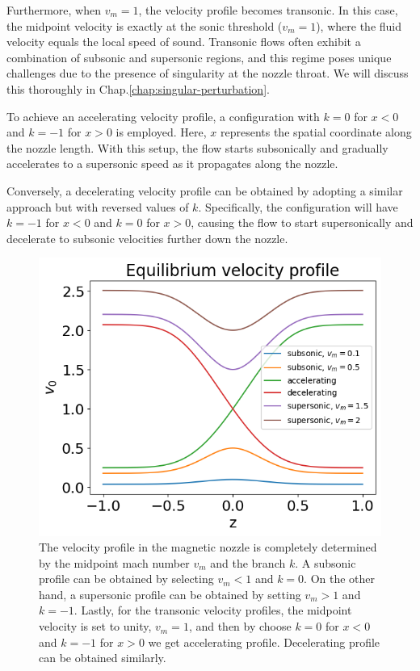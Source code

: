 Furthermore, when $v_m = 1$, the velocity profile becomes transonic. In this case, the midpoint velocity is exactly at the sonic threshold ($v_m = 1$), where the fluid velocity equals the local speed of sound. Transonic flows often exhibit a combination of subsonic and supersonic regions, and this regime poses unique challenges due to the presence of singularity at the nozzle throat. We will discuss this thoroughly in Chap.\ref{chap:singular-perturbation}.

To achieve an accelerating velocity profile, a configuration with $k = 0$ for $x < 0$ and $k = -1$ for $x > 0$ is employed. Here, $x$ represents the spatial coordinate along the nozzle length. With this setup, the flow starts subsonically and gradually accelerates to a supersonic speed as it propagates along the nozzle.

Conversely, a decelerating velocity profile can be obtained by adopting a similar approach but with reversed values of $k$. Specifically, the configuration will have $k = -1$ for $x < 0$ and $k = 0$ for $x > 0$, causing the flow to start supersonically and decelerate to subsonic velocities further down the nozzle.

\begin{figure}[H]
	\centering
	\includegraphics[width=0.7\linewidth]{img/velocity-profiles}
	\caption{The velocity profile in the magnetic nozzle is completely determined by the midpoint mach number $v_m$ and the branch $k$. A subsonic profile can be obtained by selecting $v_m<1$ and $k=0$. On the other hand, a supersonic profile can be obtained by setting $v_m>1$ and $k=-1$. Lastly, for the transonic velocity profiles, the midpoint velocity is set to unity, $v_m=1$, and then by choose $k=0$ for $x<0$ and $k=-1$ for $x>0$ we get accelerating profile. Decelerating profile can be obtained similarly.}
	\label{fig:velocity-profiles}
\end{figure}

